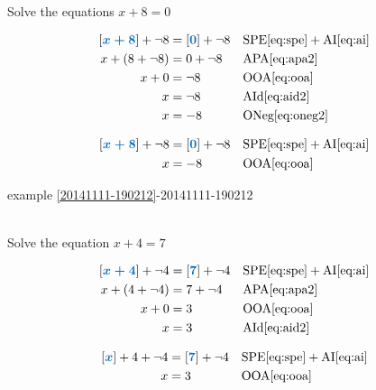 \documentclass[20150903-160354-rs2.2-MarksMathNotebook.tex]{subfiles}
\begin{document}
\begin{example}[id:20141111-222931] \label{20141111-222931} \hfill \\

Solve the equations $x+8=0$

\soln

\solnsteps
\begin{align*}
\farg{x+8}+\neg 8 &= \farg{0}+\neg 8 && \text{SPE} \eqref{eq:spe} + \text{AI} \eqref{eq:ai} \\
x+(8+\neg 8) &= 0 + \neg 8 && \text{APA} \eqref{eq:apa2} \\
x+0 &= \neg 8 && \text{OOA} \eqref{eq:ooa} \\
x &= \neg 8 && \text{AId} \eqref{eq:aid2} \\
x &= -8 && \text{ONeg} \eqref{eq:oneg2}
\end{align*}

\soln

\lesssteps
\begin{align*}
\farg{x+8}+\neg 8 &= \farg{0}+\neg 8 && \text{SPE} \eqref{eq:spe} + \text{AI} \eqref{eq:ai} \\
x &= - 8 && \text{OOA} \eqref{eq:ooa}
\end{align*}

\qdepend

\qdependlist

example \ref{20141111-190212}-20141111-190212

\end{example}

\begin{example}[id:20141206-101632] \label{20141206-101632} \hfill \\

Solve the equation $x+4=7$

\soln

\solnsteps
\begin{align*}
\farg{x +4} + \neg 4  &= \farg{7} + \neg 4  && \text{SPE} \eqref{eq:spe} + \text{AI} \eqref{eq:ai} \\
x + (4+\neg 4) &= 7 + \neg 4  && \text{APA} \eqref{eq:apa2} \\
x + 0 &= 3  && \text{OOA} \eqref{eq:ooa} \\
x  &= 3  && \text{AId} \eqref{eq:aid2}
\end{align*}

\soln

\lesssteps

\begin{align*}
\farg{x} +4 + \neg 4  &= \farg{7} + \neg 4  && \text{SPE} \eqref{eq:spe} + \text{AI} \eqref{eq:ai} \\
x &= 3  && \text{OOA} \eqref{eq:ooa}
\end{align*}
\end{example}
\end{document}
